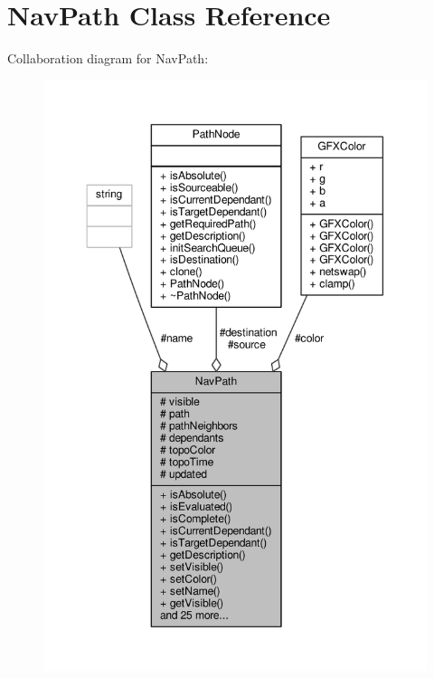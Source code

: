 \hypertarget{classNavPath}{}\section{Nav\+Path Class Reference}
\label{classNavPath}


Collaboration diagram for Nav\+Path\+:
\nopagebreak
\begin{figure}[H]
\begin{center}
\leavevmode
\includegraphics[width=350pt]{d0/d87/classNavPath__coll__graph}
\end{center}
\end{figure}
